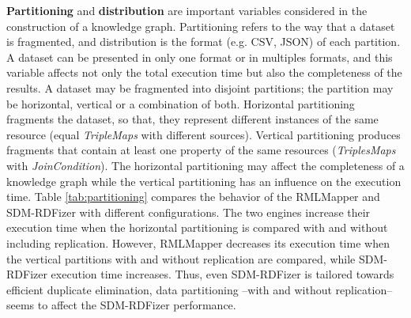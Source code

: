 \noindent \textbf{Partitioning} and \textbf{distribution} are important variables considered in the construction of a knowledge graph. Partitioning refers to the way that a dataset is fragmented, and distribution is the format (e.g. CSV, JSON) of each partition. A dataset can be presented in only one format or in multiples formats, and this variable affects not only the total execution time but also the completeness of the results. A dataset may be fragmented into disjoint partitions; the partition may be horizontal, vertical or a combination of both. Horizontal partitioning fragments the dataset, so that, they represent different instances of the same resource (equal \textit{TripleMaps} with different sources). Vertical partitioning produces fragments that contain at least one property of the same resources (\textit{TriplesMaps} with \textit{JoinCondition}). The horizontal partitioning may affect the completeness of a knowledge graph while the vertical partitioning has an influence on the execution time. Table \ref{tab:partitioning} compares the behavior of the RMLMapper and SDM-RDFizer with different configurations. The two engines increase their execution time when the horizontal partitioning is compared with and without including replication. However, RMLMapper decreases its execution time when the vertical partitions with and without replication are compared, while SDM-RDFizer execution time increases.  Thus, even SDM-RDFizer is tailored towards efficient duplicate elimination, data partitioning --with and without replication-- seems to affect the SDM-RDFizer performance. \newline

